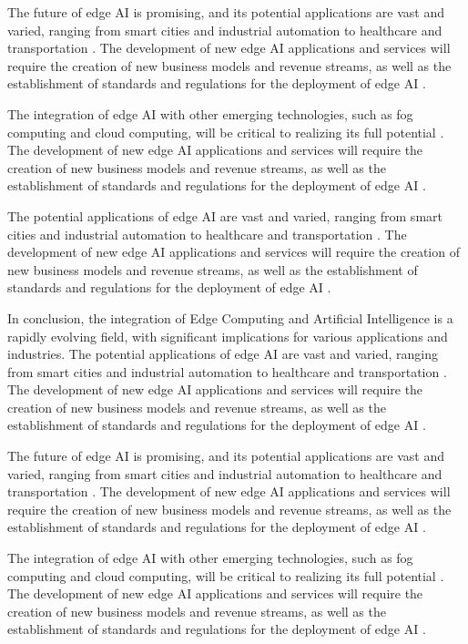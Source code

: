 \documentclass[11pt,a4paper]{article}
\begin{document}
The future of edge AI is promising, and its potential applications are vast and varied, ranging from smart cities and industrial automation to healthcare and transportation \cite{arxiv:2301.07803}. The development of new edge AI applications and services will require the creation of new business models and revenue streams, as well as the establishment of standards and regulations for the deployment of edge AI \cite{arxiv:2309.03420}. 

The integration of edge AI with other emerging technologies, such as fog computing and cloud computing, will be critical to realizing its full potential \cite{arxiv:2403.19729}. The development of new edge AI applications and services will require the creation of new business models and revenue streams, as well as the establishment of standards and regulations for the deployment of edge AI \cite{arxiv:2306.17170}. 

The potential applications of edge AI are vast and varied, ranging from smart cities and industrial automation to healthcare and transportation \cite{arxiv:2510.10166}. The development of new edge AI applications and services will require the creation of new business models and revenue streams, as well as the establishment of standards and regulations for the deployment of edge AI \cite{arxiv:2501.14823}. 

In conclusion, the integration of Edge Computing and Artificial Intelligence is a rapidly evolving field, with significant implications for various applications and industries. The potential applications of edge AI are vast and varied, ranging from smart cities and industrial automation to healthcare and transportation \cite{arxiv:2502.15775}. The development of new edge AI applications and services will require the creation of new business models and revenue streams, as well as the establishment of standards and regulations for the deployment of edge AI \cite{arxiv:2403.15665}. 

The future of edge AI is promising, and its potential applications are vast and varied, ranging from smart cities and industrial automation to healthcare and transportation \cite{arxiv:2402.13056}. The development of new edge AI applications and services will require the creation of new business models and revenue streams, as well as the establishment of standards and regulations for the deployment of edge AI \cite{arxiv:2309.05416}. 

The integration of edge AI with other emerging technologies, such as fog computing and cloud computing, will be critical to realizing its full potential \cite{arxiv:2404.13411}. The development of new edge AI applications and services will require the creation of new business models and revenue streams, as well as the establishment of standards and regulations for the deployment of edge AI \cite{arxiv:1906.08452}. 
\end{document}
